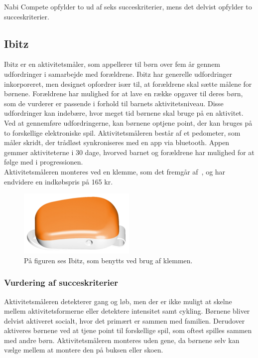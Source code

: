 Nabi Compete opfylder to ud af seks succeskriterier, mens det delvist opfylder to succeskriterier.

\subsection{Ibitz}
Ibitz er en aktivitetsmåler, som appellerer til børn over fem år gennem udfordringer i samarbejde med forældrene. Ibitz har generelle udfordringer inkorporeret, men designet opfordrer især til, at forældrene skal sætte målene for børnene. Forældrene har mulighed for at lave en række opgaver til deres børn, som de vurderer er passende i forhold til barnets aktivitetsniveau. \newline
Disse udfordringer kan indebære, hvor meget tid børnene skal bruge på en aktivitet. Ved at gennemføre udfordringerne, kan børnene optjene point, der kan bruges på to forskellige elektroniske spil. \newline
Aktivitetsmåleren består af et pedometer, som måler skridt, der trådløst synkroniseres med en app via bluetooth. Appen gemmer aktiviteterne i 30 dage, hvorved barnet og forældrene har mulighed for at følge med i progressionen.\\
Aktivitetsmåleren monteres ved en klemme, som det fremgår af~, og har endvidere en indkøbspris på 165 kr. \citep{Ibitz_features2016}

\begin{figure}[H]
	\centering
	\includegraphics[scale=0.9]{figures/aProblemanalyse/ibitz.png}
	\caption{På figuren ses Ibitz, som benytts ved brug af klemmen.\citep{Ibitz_features2016}}
	\label{fig:ibitz}
\end{figure}

\subsubsection{Vurdering af succeskriterier}
Aktivitetsmåleren detekterer gang og løb, men der er ikke muligt at skelne mellem aktivitetsformerne eller detektere intensitet samt cykling. Børnene bliver delvist aktiveret socialt, hvor det primært er sammen med familien. Derudover aktiveres børnene ved at tjene point til forskellige spil, som oftest spilles sammen med andre børn. Aktivitetsmåleren monteres uden gene, da børnene selv kan vælge mellem at montere den på buksen eller skoen.  

